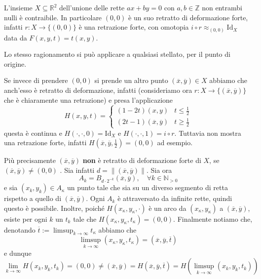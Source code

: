 \begin{example}
    L'insieme \(X \subseteq \mathbb{R}^2 \) dell'unione delle rette \(ax + by =
    0\) con \(a, b \in \mathbb{Z}\) non entrambi nulli è contraibile. In
    particolare \({(0,0)}\) è un suo retratto di deformazione forte, infatti \(r
    : X \to \{(0,0)\}\) è una retrazione forte, con omotopia \(i \circ r
    \approx_{{(0,0)}} 
    \mathrm{Id}_X\) data da \(F{(x, y, t)} = t{(x,y)}\).

    Lo stesso ragionamento si può applicare a qualsiasi stellato, per il punto
    di origine.

    Se invece di prendere \({(0,0)}\) si prende un altro punto
    \({(\overline{x},\overline{y})} \in X\) abbiamo che anch'esso è retratto di
    deformazione, infatti (consideriamo ora \(r : X \to \{(\overline{x},
    \overline{y})\}\) che è chiaramente una retrazione) e presa l'applicazione 
    \[
      H{(x, y, t)} = \begin{cases}
          (1 - 2t){(x, y)} & t \le \frac{1}{2} \\
          {(2t - 1)}{(\overline{x}, \overline{y})} & t \ge \frac{1}{2}
      \end{cases}
    \]
    questa è continua e \(H{(\cdot , \cdot , 0)} = \mathrm{Id}_X\) e \(H{(\cdot,
    \cdot , 1)} = i \circ r\). Tuttavia non mostra una retrazione forte, infatti
    \(H{(\overline{x}, \overline{y}, \frac{1}{2})} = {(0,0)}\) ad esempio.

    Più precisamente \({(\overline{x}, \overline{y})}\) \textbf{non} è retratto
    di deformazione forte di \(X\), se \({(\overline{x},
    \overline{y})} \neq {(0,0)}\) . Sia infatti \(d = \|{(\overline{x},
    \overline{y})}\|\). Sia ora
    \[
      A_k = B_{d\cdot 2^{-k}}{(\overline{x}, \overline{y})}, \quad \forall k \in
      \mathbb{N}_{> 0} 
    \]
    e sia \({(x_{k}, y_{k})} \in A_\kappa\) un punto tale che sia su un diverso
    segmento di retta rispetto a quello di \({(\overline{x}, \overline{y})}\).
    Ogni \(A_k\) è attraversato da infinite rette, quindi questo è possibile.
    Inoltre, poiché \(H{(x_\kappa, y_\kappa, \cdot )}\) è un arco da
    \({(x_\kappa, y_\kappa)}\) a \({(\overline{x}, \overline{y})}\), esiste per
    ogni \(k\) un \(t_k\) tale che \(H{(x_\kappa, y_\kappa, t_\kappa)} =
    {(0,0)}\). Finalmente notiamo che, denotando \(\overline{t} := \limsup_{k
    \to \infty} t_\kappa\) abbiamo che
    \[
      \limsup_{k \to \infty} {(x_\kappa, y_\kappa, t_\kappa)} = {(\overline{x},
      \overline{y}, \overline{t})}
    \]
    e dunque
    \[
      \lim_{k \to \infty} H{(x_k, y_k, t_k)} = {(0,0)} \neq {(\overline{x},
      \overline{y})} = H{(\overline{x}, \overline{y}, \overline{t})} =
      H{(\limsup_{k \to \infty} {(x_k, y_k, t_k)})}
    \]
\end{example}

